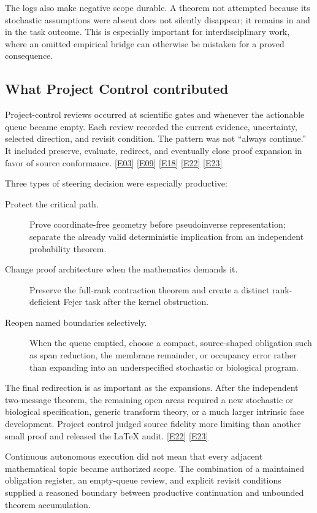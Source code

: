 \documentclass[11pt,a4paper]{article}
\newcommand{\artifact}[1]{\texttt{\detokenize{#1}}}
\newcommand{\ev}[1]{%
  \hyperref[ev:#1]{\textcolor{ReportBlue}{\textsf{\scriptsize[#1]}}}}
\begin{document}
The logs also make negative scope durable. A theorem not attempted because its
stochastic assumptions were absent does not silently disappear; it remains in
\artifact{MODEL-OBLIGATIONS.md} and in the task outcome. This is especially important
for interdisciplinary work, where an omitted empirical bridge can otherwise be
mistaken for a proved consequence.

\subsection{What Project Control contributed}

Project-control reviews occurred at scientific gates and whenever the actionable
queue became empty. Each review recorded the current evidence, uncertainty, selected
direction, and revisit condition. The pattern was not ``always continue.'' It included
preserve, evaluate, redirect, and eventually close proof expansion in favor of source
conformance. \ev{E03}\ev{E09}\ev{E18}\ev{E22}\ev{E23}

Three types of steering decision were especially productive:

\begin{description}
  \item[Protect the critical path.]
  Prove coordinate-free geometry before pseudoinverse representation; separate the
  already valid deterministic implication from an independent probability theorem.
  \item[Change proof architecture when the mathematics demands it.]
  Preserve the full-rank contraction theorem and create a distinct rank-deficient
  Fejer task after the kernel obstruction.
  \item[Reopen named boundaries selectively.]
  When the queue emptied, choose a compact, source-shaped obligation such as span
  reduction, the membrane remainder, or occupancy error rather than expanding into
  an underspecified stochastic or biological program.
\end{description}

The final redirection is as important as the expansions. After the independent
two-message theorem, the remaining open areas required a new stochastic or
biological specification, generic transform theory, or a much larger intrinsic face
development. Project control judged source fidelity more limiting than another small
proof and released the LaTeX audit. \ev{E22}\ev{E23}

\begin{turningpoint}
Continuous autonomous execution did not mean that every adjacent mathematical topic
became authorized scope. The combination of a maintained obligation register, an
empty-queue review, and explicit revisit conditions supplied a reasoned boundary
between productive continuation and unbounded theorem accumulation.
\end{turningpoint}
\end{document}
